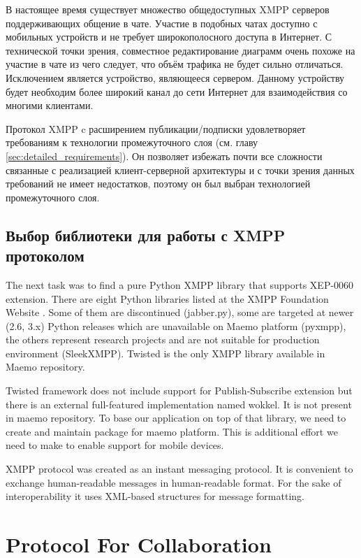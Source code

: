 В настоящее время существует множество общедоступных XMPP серверов
поддерживающих общение в чате. Участие в подобных чатах доступно с мобильных
устройств и не требует широкополосного доступа в Интернет. С технической точки
зрения, совместное редактирование диаграмм очень похоже на участие в чате из
чего следует, что объём трафика не будет сильно отличаться. Исключением является
устройство, являющееся сервером. Данному устройству будет необходим более
широкий канал до сети Интернет для взаимодействия со многими клиентами.

Протокол XMPP c расширением публикации/подписки удовлетворяет требованиям к
технологии промежуточного слоя (см. главу \ref{sec:detailed_requirements}). Он
позволяет избежать почти все сложности связанные с реализацией клиент-серверной
архитектуры и с точки зрения данных требований не имеет недостатков, поэтому он
был выбран технологией промежуточного слоя.


\subsection{Выбор библиотеки для работы с XMPP протоколом}
The next task was to find a pure Python XMPP library that supports XEP-0060
extension. There are eight Python libraries listed at the XMPP Foundation
Website \cite{xmpp}. Some of them are discontinued (jabber.py), some are
targeted at newer (2.6, 3.x) Python releases which are unavailable on Maemo
platform (pyxmpp), the others represent research projects and are not suitable
for production environment (SleekXMPP). Twisted is the only XMPP library
available in Maemo repository.

Twisted framework does not include support for Publish-Subscribe extension but
there is an external full-featured implementation named wokkel.
It is not present in maemo repository. To base our application on top of that 
library, we need to create and maintain package for maemo platform. This is
additional effort we need to make to enable support for mobile devices.

XMPP protocol was created as an instant messaging protocol. It is convenient to
exchange human-readable messages in human-readable format. For the sake of 
interoperability it uses XML-based structures for message formatting. 

\section{Protocol For Collaboration}

